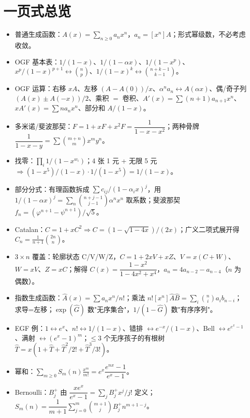 \documentclass[UTF8,a4paper,11pt]{ctexart}
\begin{document}
\section*{一页式总览}
\begin{itemize}
\item 普通生成函数：$A(x)=\sum_{n\ge0}a_nx^n$，$a_n=[x^n]A$；形式幂级数，不必考虑收敛。
\item OGF 基本表：$1/(1-x)$、$1/(1-\alpha x)$、$1/(1-x^p)$、$x^p/(1-x)^{p+1}\leftrightarrow\binom np$、$1/(1-x)^k\leftrightarrow\binom{n+k-1}{k-1}$。
\item OGF 运算：右移 $xA$、左移 $(A-A(0))/x$、$\alpha^na_n\leftrightarrow A(\alpha x)$、偶/奇子列 $(A(x)\pm A(-x))/2$、乘积 $=$ 卷积、$A'(x)=\sum(n+1)a_{n+1}x^n$、$xA'(x)=\sum na_nx^n$、部分和 $A/(1-x)$。
\item 多米诺/斐波那契：$F=1+xF+x^2F=\dfrac1{1-x-x^2}$；两种骨牌 $\dfrac1{1-x-y}=\sum\binom{m+n}{m}x^my^n$。
\item 找零：$\prod_i 1/(1-x^{w_i})$；4 张 1 元 + 无限 5 元 $\Rightarrow (1-x^5)/(1-x)\cdot 1/(1-x^5)=1/(1-x)$。
\item 部分分式：有理函数拆成 $\sum c_{ij}/(1-\alpha_ix)^j$，用 $1/(1-\alpha x)^j=\sum_n\binom{n+j-1}{j-1}\alpha^nx^n$ 取系数；斐波那契 $f_n=(\varphi^{n+1}-\psi^{n+1})/\sqrt5$。
\item Catalan：$C=1+xC^2\Rightarrow C=(1-\sqrt{1-4x})/(2x)$；广义二项式展开得 $C_n=\frac1{n+1}\binom{2n}{n}$。
\item $3\times n$ 覆盖：轮廓状态 C/V/W/Z，$C=1+2xV+xZ$、$V=x(C+W)$、$W=xV$、$Z=xC$；解得 $C(x)=\dfrac{1-x^2}{1-4x^2+x^4}$，$a_n=4a_{n-2}-a_{n-4}$（$n$ 为偶数）。
\item 指数生成函数：$\hat A(x)=\sum a_nx^n/n!$；乘法 $n![x^n]\hat A\hat B=\sum_i\binom ni a_ib_{n-i}$；求导=左移；$\exp(\hat G)$ 数"无序集合"，$1/(1-\hat G)$ 数"有序序列"。
\item EGF 例：$1\leftrightarrow e^x$、$n!\leftrightarrow 1/(1-x)$、错排 $\leftrightarrow e^{-x}/(1-x)$、Bell $\leftrightarrow e^{e^x-1}$、满射 $\leftrightarrow (e^x-1)^m$；$\le3$ 个无序孩子的有根树 $\hat T=x(1+\hat T+\hat T^2/2!+\hat T^3/3!)$。
\item 幂和：$\sum_{m\ge0}S_m(n)\frac{x^m}{m!}=e^x\dfrac{e^{nx}-1}{e^x-1}$。
\item Bernoulli：$B_j^+$ 由 $\dfrac{xe^x}{e^x-1}=\sum_jB_j^+x^j/j!$ 定义；$S_m(n)=\dfrac1{m+1}\sum_{j=0}^m\binom{m+1}{j}B_j^+n^{m+1-j}$。
\end{itemize}
\end{document}
